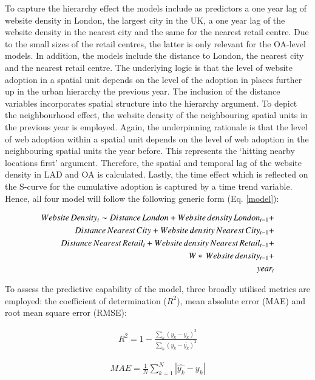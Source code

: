 \documentclass[
  authoryear,
  preprint,
  3p]{elsarticle}
\begin{document}
To capture the hierarchy effect the models include as predictors a one
year lag of website density in London, the largest city in the UK, a one
year lag of the website density in the nearest city and the same for the
nearest retail centre. Due to the small sizes of the retail centres, the
latter is only relevant for the OA-level models. In addition, the models
include the distance to London, the nearest city and the nearest retail
centre. The underlying logic is that the level of website adoption in a
spatial unit depends on the level of the adoption in places further up
in the urban hierarchy the previous year. The inclusion of the distance
variables incorporates spatial structure into the hierarchy argument. To
depict the neighbourhood effect, the website density of the neighbouring
spatial units in the previous year is employed. Again, the underpinning
rationale is that the level of web adoption within a spatial unit
depends on the level of web adoption in the neighbouring spatial units
the year before. This represents the `hitting nearby locations first'
argument. Therefore, the spatial and temporal lag of the website density
in LAD and OA is calculated. Lastly, the time effect which is reflected
on the S-curve for the cumulative adoption is captured by a time trend
variable. Hence, all four model will follow the following generic form
(Eq. \ref{model}):

\begin{align} \label{model}
Website\,Density_{t} \sim Distance\,London +
Website\,density\,London_{t-1} +\notag\\
Distance\,Nearest\,City +
Website\,density\,Nearest\,City_{t-1} +\notag\\
Distance\,Nearest\,Retail_{i} +
Website\,density\,Nearest\,Retail_{t-1} +\notag\\
W*\, Website\,density_{t-1} +\notag\\ 
year_{t}
\end{align}

To assess the predictive capability of the model, three broadly utilised
metrics are employed: the coefficient of determination (\(R^2\)), mean
absolute error (MAE) and root mean square error (RMSE):

\begin{align}
R^2 = 1 - \frac{\sum_{k} (y_{k} - \hat{y_{k}})^2} {\sum_{k} (y_{k} - \overline{y_{k}})^2} \label{eq:rsquared}
\end{align}

\begin{align}
MAE = \frac{1}{N} \sum_{k = 1}^{N} |\hat{y_{k}} - y_{k}| \label{eq:mae}
\end{align}
\end{document}
